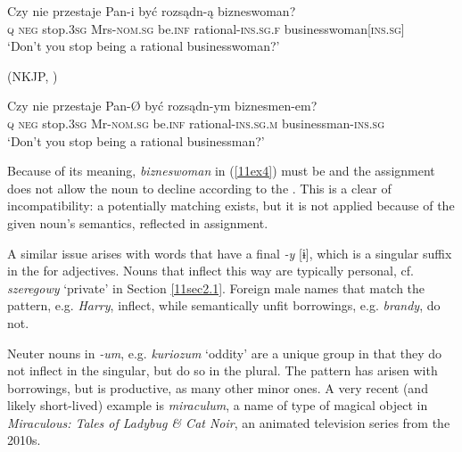 \documentclass[output=paper,colorlinks,citecolor=brown]{langscibook}
\begin{document}
\begin{exe}
	\ex \label{11ex4}
	\gll Czy nie przestaje Pan-i być rozsądn-ą bizneswoman? \\
	\textsc{q} \textsc{neg} stop.\textsc{3sg} Mrs-\textsc{nom.sg} be.\textsc{inf} rational-\textsc{ins.sg.f} businesswoman[\textsc{ins.sg}] \\
	\trans ‘Don’t you stop being a rational businesswoman?’
	
	\hfill (NKJP, \citealt{przepiorkowskibankogorskilewandowskatomaszczyk2012})
	
	\ex \label{11ex5}
	\gll Czy nie przestaje Pan-Ø być rozsądn-ym biznesmen-em? \\
	\textsc{q} \textsc{neg} stop.\textsc{3sg} Mr-\textsc{nom.sg} be.\textsc{inf} rational-\textsc{ins.sg.m} businessman-\textsc{ins.sg} \\
	\trans ‘Don’t you stop being a rational businessman?’
\end{exe}

Because of its meaning,\emph{ bizneswoman} in (\ref{11ex4}) must be  and the  assignment does not allow the noun to decline according to the  . This is a clear  of incompatibility: a potentially matching  exists, but it is not applied because of the given noun's semantics, reflected in  assignment.

A similar issue arises with words that have a final \emph{-y} [ɨ], which is a  singular suffix in the   for adjectives. Nouns that inflect this way are typically  personal, cf. \emph{szeregowy} `private' in Section \ref{11sec2.1}. Foreign male names that match the pattern, e.g. \emph{Harry}, inflect, while semantically unfit borrowings, e.g. \emph{brandy}, do not.

Neuter nouns in \emph{-um}, e.g. \emph{kuriozum} `oddity' are a unique group in that they do not inflect in the singular, but do so in the plural. The pattern has arisen with  borrowings, but is productive, as many other minor ones. A very recent (and likely short-lived) example is \emph{miraculum}, a name of type of magical object in \emph{Miraculous: Tales of Ladybug \& Cat Noir}, an animated television series from the 2010s.
\end{document}
